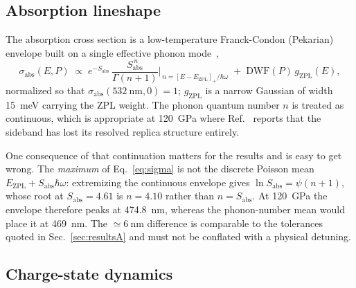 \documentclass[preprint,12pt]{elsarticle}
\newcommand{\sabs}{\ensuremath{\sigma_{\mathrm{abs}}}}
\begin{document}
\subsection{Absorption lineshape}
\label{sec:model:sigma}

The absorption cross section is a low-temperature Franck-Condon (Pekarian)
envelope built on a single effective phonon mode~\cite{Huang1950,Razinkovas2021vib},
\begin{equation}
  \sabs(E,P) \;\propto\;
  e^{-S_{\mathrm{abs}}}\,\frac{S_{\mathrm{abs}}^{\,n}}{\Gamma(n+1)}
  \bigg|_{\,n = [E-E_{\mathrm{ZPL}}]_{+}/\hbar\omega}
  \;+\; \mathrm{DWF}(P)\,g_{\mathrm{ZPL}}(E),
  \label{eq:sigma}
\end{equation}
normalized so that $\sabs(\SI{532}{\nano\meter}, 0) = 1$; $g_{\mathrm{ZPL}}$ is a
narrow Gaussian of width \SI{15}{\milli\electronvolt} carrying the ZPL weight.
The phonon quantum number $n$ is treated as continuous, which is appropriate at
\SI{120}{\giga\pascal} where Ref.~\cite{Ho2026} reports that the sideband has
lost its resolved replica structure entirely.

One consequence of that continuation matters for the results and is easy to get
wrong. The \emph{maximum} of Eq.~\eqref{eq:sigma} is not the discrete Poisson
mean $E_{\mathrm{ZPL}} + S_{\mathrm{abs}}\hbar\omega$: extremizing the continuous
envelope gives $\ln S_{\mathrm{abs}} = \psi(n+1)$, whose root at $S_{\mathrm{abs}}
= 4.61$ is $n = 4.10$ rather than $n = S_{\mathrm{abs}}$. At
\SI{120}{\giga\pascal} the envelope therefore peaks at \SI{474.8}{\nano\meter},
whereas the phonon-number mean would place it at \SI{469}{\nano\meter}. The
$\simeq\SI{6}{\nano\meter}$ difference is comparable to the tolerances quoted in
Sec.~\ref{sec:resultsA} and must not be conflated with a physical detuning.

\subsection{Charge-state dynamics}
\label{sec:model:charge}
\end{document}
